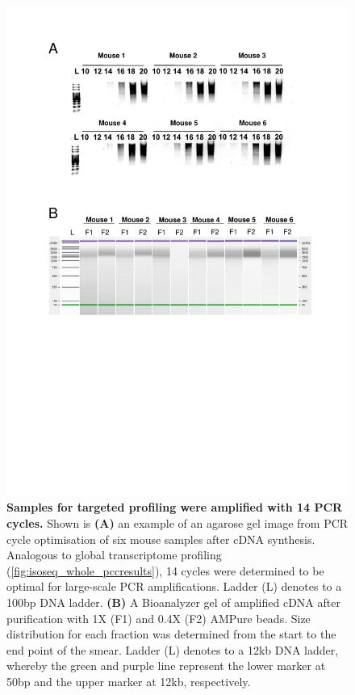 \begin{figure}[htp]
	\centering
	\vspace{20pt}
	\includegraphics[page=1,trim={0 10cm 0 0cm},clip,scale = 0.75]{Figures/TargetedTranscriptome_LabResults.pdf}
	\captionsetup{width=0.95\textwidth}
	\caption[Iso-Seq targeted profiling - PCR cycle optimisation]%
	{\textbf{Samples for targeted profiling were amplified with 14 PCR cycles.} Shown is \textbf{(A)} an example of an agarose gel image from PCR cycle optimisation of six mouse samples after cDNA synthesis. Analogous to global transcriptome profiling (\cref{fig:isoseq_whole_pccresults}), 14 cycles were determined to be optimal for large-scale PCR amplifications. Ladder (L) denotes to a 100bp DNA ladder. \textbf{(B)} A Bioanalyzer gel of amplified cDNA after purification with 1X (F1) and 0.4X (F2) AMPure beads. Size distribution for each fraction was determined from the start to the end point of the smear. Ladder (L) denotes to a 12kb DNA ladder, whereby the green and purple line represent the lower marker at 50bp and the upper marker at 12kb, respectively.}
	\label{fig:isoseq_targeted_pccresults}
\end{figure}


